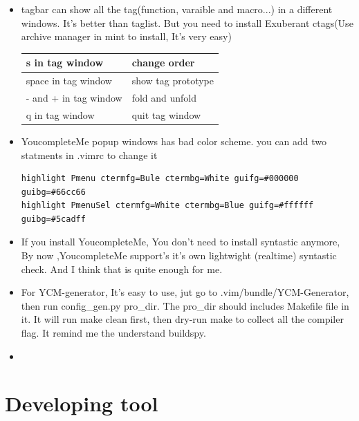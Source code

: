\documentclass[a4paper,12pt,twoside]{book}
\begin{document}
\begin{itemize}
\item tagbar can show all the tag(function, varaible and macro...) in a different windows. It's better than taglist. But you need to install Exuberant ctags(Use archive manager in mint to install, It's very easy)\\
\begin{tabular}{|p{}|p{}|}
\hline 
s in tag window & change order \\ 
\hline 
space in tag window & show tag prototype  \\ 
\hline 
- and + in tag window & fold and unfold \\ 
\hline 
q in tag window & quit tag window \\ 
\hline 
\end{tabular} 

\item YoucompleteMe popup windows has bad color scheme. you can add two statments in .vimrc to change it 
\begin{verbatim}
highlight Pmenu ctermfg=Bule ctermbg=White guifg=#000000 guibg=#66cc66
highlight PmenuSel ctermfg=White ctermbg=Blue guifg=#ffffff guibg=#5cadff
\end{verbatim}

\item If you install YoucompleteMe, You don't need to install syntastic anymore, By now ,YoucompleteMe support's it's own lightwight (realtime) syntastic check. And I think that is quite enough for me.  

\item For YCM-generator, It's easy to use, jut go to .vim/bundle/YCM-Generator, then run config\_gen.py pro\_dir. The pro\_dir should includes Makefile file in it.  It will run make clean first, then dry-run make to collect all the compiler flag. It remind me the understand buildspy. 

\item  

\end{itemize}


\chapter{Developing tool}
\end{document}
